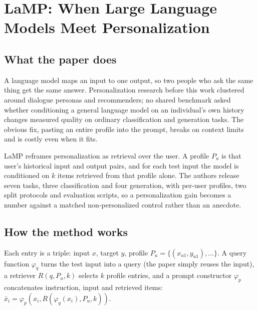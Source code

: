 \section{LaMP: When Large Language Models Meet Personalization}

\subsection{What the paper does}

A language model maps an input to one output, so two people who ask the same thing get the same answer. Personalization research before this work clustered around dialogue personas and recommenders; no shared benchmark asked whether conditioning a general language model on an individual's own history changes measured quality on ordinary classification and generation tasks. The obvious fix, pasting an entire profile into the prompt, breaks on context limits and is costly even when it fits.

LaMP reframes personalization as retrieval over the user. A profile $P_u$ is that user's historical input and output pairs, and for each test input the model is conditioned on $k$ items retrieved from that profile alone. The authors release seven tasks, three classification and four generation, with per-user profiles, two split protocols and evaluation scripts, so a personalization gain becomes a number against a matched non-personalized control rather than an anecdote.

\subsection{How the method works}

Each entry is a triple: input $x$, target $y$, profile $P_u = \{(x_{u1}, y_{u1}), \ldots\}$. A query function $\varphi_q$ turns the test input into a query (the paper simply reuses the input), a retriever $R(q, P_u, k)$ selects $k$ profile entries, and a prompt constructor $\varphi_p$ concatenates instruction, input and retrieved items: $\bar{x}_i = \varphi_p(x_i, R(\varphi_q(x_i), P_u, k))$.

